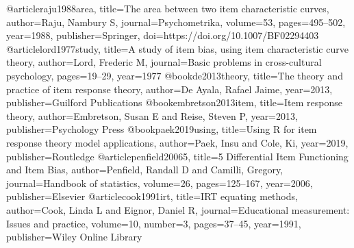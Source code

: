 @article{raju1988area,
  title={The area between two item characteristic curves},
  author={Raju, Nambury S},
  journal={Psychometrika},
  volume={53},
  pages={495--502},
  year={1988},
  publisher={Springer}, 
  doi={https://doi.org/10.1007/BF02294403}
}
@article{lord1977study,
  title={A study of item bias, using item characteristic curve theory},
  author={Lord, Frederic M},
  journal={Basic problems in cross-cultural psychology},
  pages={19--29},
  year={1977}
}
@book{de2013theory,
  title={The theory and practice of item response theory},
  author={De Ayala, Rafael Jaime},
  year={2013},
  publisher={Guilford Publications}
}
@book{embretson2013item,
  title={Item response theory},
  author={Embretson, Susan E and Reise, Steven P},
  year={2013},
  publisher={Psychology Press}
}
@book{paek2019using,
  title={Using R for item response theory model applications},
  author={Paek, Insu and Cole, Ki},
  year={2019},
  publisher={Routledge}
}
@article{penfield20065,
  title={5 Differential Item Functioning and Item Bias},
  author={Penfield, Randall D and Camilli, Gregory},
  journal={Handbook of statistics},
  volume={26},
  pages={125--167},
  year={2006},
  publisher={Elsevier}
}
@article{cook1991irt,
  title={IRT equating methods},
  author={Cook, Linda L and Eignor, Daniel R},
  journal={Educational measurement: Issues and practice},
  volume={10},
  number={3},
  pages={37--45},
  year={1991},
  publisher={Wiley Online Library}
}